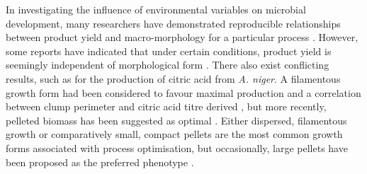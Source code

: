 
In investigating the influence of environmental variables on microbial development, many researchers have demonstrated reproducible relationships between product yield and macro-morphology for a particular process \cite{carlsen1996a,xu2000,jppark2002,couri2003,elenshasy2006,elsabbagh2006,papagianni2006a,dobson2008a}. However, some reports have indicated that under certain conditions, product yield is seemingly independent of morphological form \cite{johansen1998,amanullah1999,papagianni1994,muller2002,amanullah2002,jayus2005}. There also exist conflicting results, such as for the production of citric acid from \emph{A. niger}. A filamentous growth form had been considered to favour maximal production \cite{paul1999} and a correlation between clump perimeter and citric acid titre derived \cite{papagianni1998}, but more recently, pelleted biomass has been suggested as optimal \cite{ali2006}. Either dispersed, filamentous growth \cite{carlsen1996a,dobson2008a,elsabbagh2006} or comparatively small, compact pellets \cite{elenshasy2006,couri2003,xu2000,jppark2002} are the most common growth forms associated with process optimisation, but occasionally, large pellets have been proposed as the preferred phenotype \cite{papagianni2006a}.


